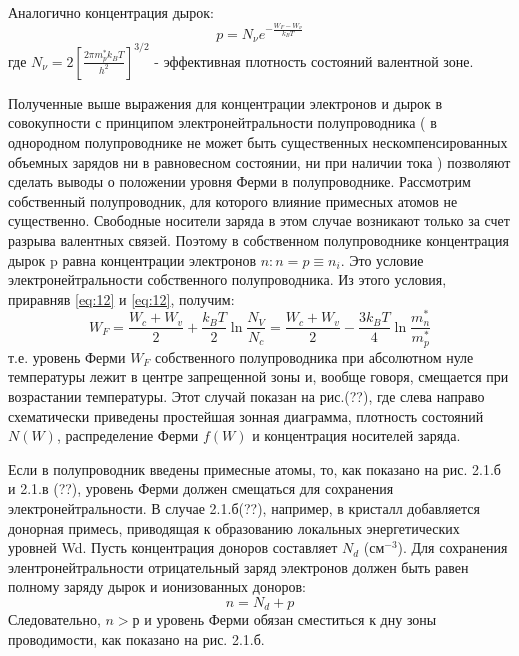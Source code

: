 Аналогично концентрация дырок: 
\begin{equation}
	p=N_{\nu} e^{-\frac{W_{F}-W_{\nu}}{k_{B} T}}
	\label{eq:13}
\end{equation}
где $N_{\nu}=2\left[\frac{2 \pi m_{p}^{*} k_{B} T}{h^{2}}\right]^{3 / 2}$ - эффективная плотность состояний валентной зоне.

Полученные выше выражения для концентрации электронов и дырок в совокупности с принципом электронейтральности
полупроводника ( в однородном полупроводнике не может быть существенных нескомпенсированных объемных зарядов ни в
равновесном состоянии, ни при наличии тока ) позволяют сделать выводы о положении уровня Ферми в полупроводнике.
Рассмотрим собственный полупроводник, для которого влияние примесных атомов не существенно. Свободные носители заряда в
этом случае возникают только за счет разрыва валентных связей. Поэтому в собственном полупроводнике концентрация дырок p
равна концентрации электронов $ n: n = p \equiv n_i$. Это условие электронейтральности собственного полупроводника. Из этого
условия, приравняв \eqref{eq:12} и \eqref{eq:12}, получим:
\begin{equation}
	W_{F}=\frac{W_{c}+W_{v}}{2}+\frac{k_{B} T}{2} \ln \frac{N_{V}}{N_{c}}=\frac{W_{c}+W_{v}}{2}-\frac{3 k_{B} T}{4} \ln \frac{m_{n}^{*}}{m_{p}^{*}}
	\label{eq:14}
\end{equation}
т.е. уровень Ферми $W_F$ собственного полупроводника при абсолютном нуле температуры лежит в центре запрещенной зоны и,
вообще говоря, смещается при возрастании температуры. Этот случай показан на рис.(??), где слева направо схематически
приведены простейшая зонная диаграмма, плотность состояний $N(W)$, распределение Ферми $f (W)$ и концентрация носителей
заряда.

Если в полупроводник введены примесные атомы, то, как показано на рис. 2.1.б и 2.1.в (??), уровень Ферми должен смещаться для
сохранения электронейтральности. В случае 2.1.б(??), например, в кристалл добавляется донорная примесь, приводящая к
образованию локальных энергетических уровней Wd. Пусть концентрация доноров составляет $N_d$ (см$^{-3}$). Для сохранения
элентронейтральности отрицательный заряд электронов должен быть равен полному заряду дырок и ионизованных доноров:
\begin{equation}
	n = N_d+p
	\label{eq:15}
\end{equation}
Следовательно, $n>р$ и уровень Ферми обязан сместиться к дну зоны проводимости, как показано на рис. 2.1.б.


